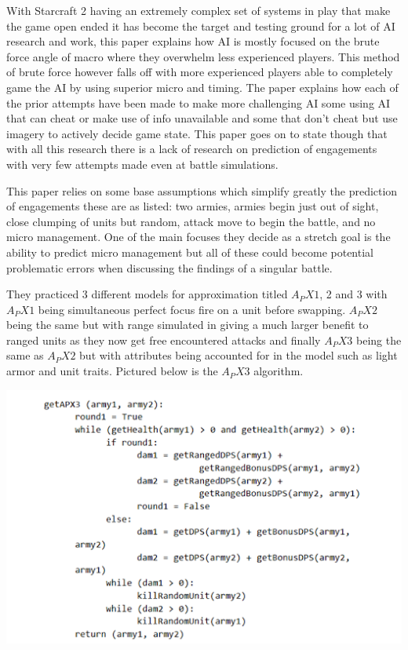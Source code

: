 \documentclass[a4paper,12pt]{report}
\begin{document}
With Starcraft 2 having an extremely complex set of systems in play that make the game open ended it has become the target and testing ground for a lot of AI research and work, this paper explains how AI is mostly focused on the brute force angle of macro where they overwhelm less experienced players. This method of brute force however falls off with more experienced players able to completely game the AI by using superior micro and timing. The paper explains how each of the prior attempts have been made to make more challenging AI some using AI that can cheat or make use of info unavailable and some that don’t cheat but use imagery to actively decide game state. This paper goes on to state though that with all this research there is a lack of research on prediction of engagements with very few attempts made even at battle simulations.

This paper relies on some base assumptions which simplify greatly the prediction of engagements these are as listed: two armies, armies begin just out of sight, close clumping of units but random, attack move to begin the battle, and no micro management. One of the main focuses they decide as a stretch goal is the ability to predict micro management but all of these could become potential problematic errors when discussing the findings of a singular battle.

They practiced 3 different models for approximation titled $A_PX1$, 2 and 3 with $A_PX1$ being simultaneous perfect focus fire on a unit before swapping. $A_PX2$ being the same but with range simulated in giving a much larger benefit to ranged units as they now get free encountered attacks and finally $A_PX3$ being the same as $A_PX2$ but with attributes being accounted for in the model such as light armor and unit traits. Pictured below is the $A_PX3$ algorithm.

\begin{center}
    \captionsetup{type=figure}
    \includegraphics[width=.9\linewidth]{media/APXcode.png}
\end{center}
\end{document}
